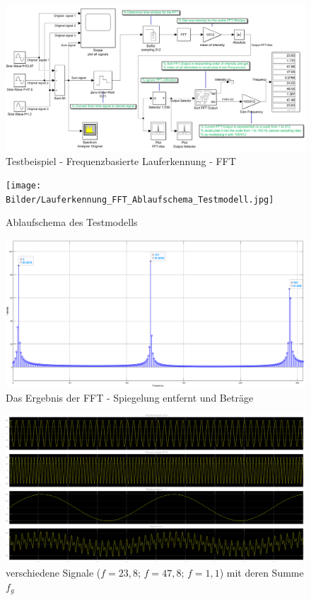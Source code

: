 \begin{landscape}
	\begin{figure}[H]
		\centering
		\includegraphics[width=\linewidth]{Bilder/Lauferkennung_FFT_Testmodell1.png}
		\caption{Testbeispiel - Frequenzbasierte Lauferkennung - FFT}
		\label{fig:Lauferkennung_Freqbasiert_FFT_Testmodell}
	\end{figure}
\end{landscape}

\begin{figure}[H]
	\centering
	\texttt{[image: Bilder/Lauferkennung\_FFT\_Ablaufschema\_Testmodell.jpg]}
	\caption{Ablaufschema des Testmodells}
	\label{fig:Lauferkennung_FFT_Ablaufschema_Testmodell}
\end{figure}

\begin{figure}[H]
	\centering
	\includegraphics[width=\linewidth]{Bilder/FFT_Ergebnis_Skala_512.png}
	\caption{Das Ergebnis der FFT - Spiegelung entfernt und Beträge}
	\label{fig:FFT_Ergebnis_Skala_512}
\end{figure}
\begin{figure}[H]
	\centering
	\includegraphics[width=\linewidth]{Bilder/Testsignal_AllViews.png}
	\caption{verschiedene Signale ($f=23,8$; $f=47,8$; $f=1,1$) mit deren Summe $f_g$}
	\label{fig:Testsignal_AllViews}
\end{figure}


